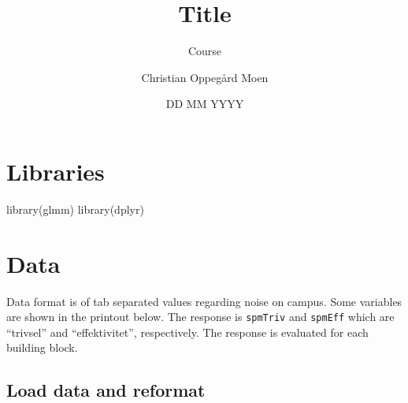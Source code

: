 \documentclass[
]{article}
\title{Title}
\subtitle{Course}
\author{Christian Oppegård Moen}
\date{DD MM YYYY}
\newenvironment{Shaded}{\begin{snugshade}}{\end{snugshade}}
\newcommand{\FunctionTok}[1]{\textcolor[rgb]{0.00,0.00,0.00}{#1}}
\newcommand{\NormalTok}[1]{#1}
\begin{document}
\maketitle

{
\hypersetup{linkcolor=}
\setcounter{tocdepth}{3}
\tableofcontents
}
\hypertarget{libraries}{%
\section{Libraries}\label{libraries}}

\begin{Shaded}
\begin{Highlighting}[]
\FunctionTok{library}\NormalTok{(glmm)}
\FunctionTok{library}\NormalTok{(dplyr)}
\end{Highlighting}
\end{Shaded}

\hypertarget{data}{%
\section{Data}\label{data}}

Data format is of tab separated values regarding noise on campus. Some variables are shown in the printout below. The response is \texttt{spmTriv} and \texttt{spmEff} which are ``trivsel'' and ``effektivitet'', respectively. The response is evaluated for each building block.

\hypertarget{load-data-and-reformat}{%
\subsection{Load data and reformat}\label{load-data-and-reformat}}
\end{document}
